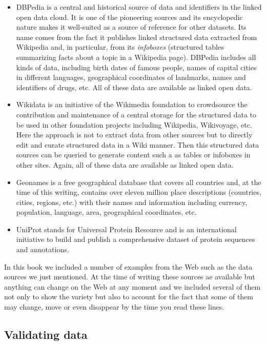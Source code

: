 \begin{itemize}
\item
  DBPedia is a central and historical source of data and identifiers in
  the linked open data cloud. It is one of the pioneering sources and
  its encyclopedic nature makes it well-suited as a source of reference
  for other datasets. Its name comes from the fact it publishes linked
  structured data extracted from Wikipedia and, in particular, from its
  \emph{infoboxes} (structured tables summarizing facts about a topic in
  a Wikipedia page). DBPedia includes all kinds of data, including birth
  dates of famous people, names of capital cities in different
  languages, geographical coordinates of landmarks, names and
  identifiers of drugs, etc. All of these data are available as linked
  open data.
\item
  Wikidata is an initiative of the Wikimedia foundation to crowdsource
  the contribution and maintenance of a central storage for the
  structured data to be used in other foundation projects including
  Wikipedia, Wikivoyage, etc. Here the approach is not to extract data
  from other sources but to directly edit and curate structured data in
  a Wiki manner. Then this structured data sources can be queried to
  generate content such a as tables or infoboxes in other sites. Again,
  all of these data are available as linked open data.
\item
  Geonames is a free geographical database that covers all countries
  and, at the time of this writing, contains over eleven million place
  descriptions (countries, cities, regions, etc.) with their names and
  information including currency, population, language, area,
  geographical coordinates, etc.
\item
  UniProt stands for Universal Protein Resource and is an international
  initiative to build and publish a comprehensive dataset of protein
  sequences and annotations.
\end{itemize}

In this book we included a number of examples from the Web such as the
data sources we just mentioned. At the time of writing these sources ae
available but anything can change on the Web at any moment and we
included several of them not only to show the variety but also to
account for the fact that some of them may change, move or even
disappear by the time you read these lines.

\hypertarget{validating-data}{%
\subsection{Validating data}\label{validating-data}}

